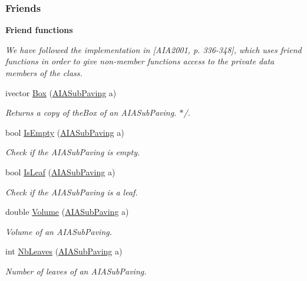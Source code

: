 \subsubsection*{\-Friends}
\begin{Indent}{\bf \-Friend functions}\par
{\em \-We have followed the implementation in \mbox{[}\-A\-I\-A2001, p. 336-\/348\mbox{]}, which uses friend functions in order to give non-\/member functions access to the private data members of the class. }\begin{DoxyCompactItemize}
\item 
ivector \hyperlink{classAIASPnode_ae78ba41711edb725cf1ef43c27144be3}{\-Box} (\hyperlink{AIAsubpaving_8hpp_ab6618d8727b32e897c1b7ab3415b93ff}{\-A\-I\-A\-Sub\-Paving} a)
\begin{DoxyCompactList}\small\item\em \-Returns a copy of the\-Box of an \-A\-I\-A\-Sub\-Paving. $\ast$/. \end{DoxyCompactList}\item 
bool \hyperlink{classAIASPnode_a1d5eb42dff486e08cf1cb54fa2a719a4}{\-Is\-Empty} (\hyperlink{AIAsubpaving_8hpp_ab6618d8727b32e897c1b7ab3415b93ff}{\-A\-I\-A\-Sub\-Paving} a)
\begin{DoxyCompactList}\small\item\em \-Check if the \-A\-I\-A\-Sub\-Paving is empty. \end{DoxyCompactList}\item 
bool \hyperlink{classAIASPnode_a8528a3302f3cce257686222b065bb807}{\-Is\-Leaf} (\hyperlink{AIAsubpaving_8hpp_ab6618d8727b32e897c1b7ab3415b93ff}{\-A\-I\-A\-Sub\-Paving} a)
\begin{DoxyCompactList}\small\item\em \-Check if the \-A\-I\-A\-Sub\-Paving is a leaf. \end{DoxyCompactList}\item 
double \hyperlink{classAIASPnode_a7f6354ab5e7b1310b03f0e190169eabe}{\-Volume} (\hyperlink{AIAsubpaving_8hpp_ab6618d8727b32e897c1b7ab3415b93ff}{\-A\-I\-A\-Sub\-Paving} a)
\begin{DoxyCompactList}\small\item\em \-Volume of an \-A\-I\-A\-Sub\-Paving. \end{DoxyCompactList}\item 
int \hyperlink{classAIASPnode_a6cc4fba2aef7df53e990c5348f84bd3b}{\-Nb\-Leaves} (\hyperlink{AIAsubpaving_8hpp_ab6618d8727b32e897c1b7ab3415b93ff}{\-A\-I\-A\-Sub\-Paving} a)
\begin{DoxyCompactList}\small\item\em \-Number of leaves of an \-A\-I\-A\-Sub\-Paving. \end{DoxyCompactList}\item 

\end{DoxyCompactItemize}
\end{Indent}
